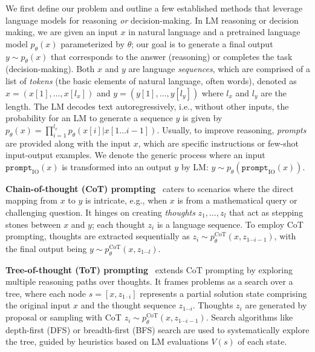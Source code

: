 \documentclass{article}
\newcommand{\yxw}[1]{\textcolor{blue}{[{\bf yxw:} #1]}}
\newcommand{\kai}[1]{\textcolor{purple}{[{\bf kai:} #1]}}
\newcommand{\az}[1]{\textcolor{orange}{[{\bf andy:} #1]}}
\theoremstyle{plain}
\theoremstyle{definition}
\theoremstyle{remark}
\begin{document}
We first define our problem and outline a few established methods that leverage language models for reasoning \emph{or} decision-making. In LM reasoning or decision making, we are given an input $x$ in natural language and a pretrained language model $p_\theta(x)$ parameterized by $\theta$; our goal is to generate a final output $y\sim p_\theta(x)$ that corresponds to the answer (reasoning) or completes the task (decision-making). Both $x$ and $y$ are language \textit{sequences}, which are comprised of a list of \textit{tokens} (the basic elements of natural language, often words), denoted as \( x = (x[1], \dots, x[l_x]) \) and \( y = (y[1], \dots, y[l_y]) \) where $l_x$ and $l_y$ are the length. The LM decodes text autoregressively, i.e., without other inputs, the probability for an LM to generate a sequence $y$ is given by \(p_\theta(x) = \prod_{i=1}^{l_x} p_\theta(x[i] | x[1 \dots i-1]) \). Usually, to improve reasoning, \textit{prompts} are provided along with the input $x$, which are specific instructions or few-shot input-output examples. We denote the generic process where an input \( \texttt{prompt}_{\mathrm{IO}}(x) \) is transformed into an output \( y \) by LM: \( y \sim p_\theta(\texttt{prompt}_{\mathrm{IO}}(x)) \).

\textbf{Chain-of-thought (CoT) prompting}~\citep{wei2022chain} caters to scenarios where the direct mapping from \( x \) to \( y \) is intricate, e.g., when \( x \) is from a mathematical query or challenging question. It hinges on creating \textit{thoughts} \( z_1, \dots, z_l \) that act as stepping stones between \( x \) and \( y \); each thought $z_i$ is a language sequence. To employ CoT prompting, thoughts are extracted sequentially as \( z_i \sim p_\theta^{\mathrm{CoT}}(x, z_{1\cdots i-1}) \), with the final output being \( y \sim p_\theta^{\mathrm{CoT}}(x, z_{1 \cdots l}) \).

\textbf{Tree-of-thought (ToT) prompting}~\citep{yao2023tree} extends CoT prompting by exploring multiple reasoning paths over thoughts. It frames problems as a search over a tree, where each node $s=[x, z_{1\cdot i}]$ represents a partial solution state comprising the original input $x$ and the thought sequence $z_{1\cdots i}$. Thoughts $z_{i}$ are generated by proposal or sampling with CoT \( z_i \sim p_\theta^\mathrm{CoT}(x, z_{1\cdots i-1}) \). Search algorithms like depth-first (DFS) or breadth-first (BFS) search are used to systematically explore the tree, guided by heuristics based on LM evaluations $V(s)$ of each state.
\end{document}
